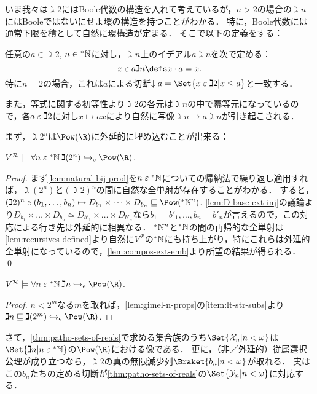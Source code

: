 \documentclass[realisability.tex]{subfiles}
\begin{document}
いま我々は$\gimel 2$にはBoole代数の構造を入れて考えているが，$n > 2$の場合の$\gimel n$にはBooleではないにせよ環の構造を持つことがわかる．
特に，Boole代数には通常下限を積として自然に環構造が定まる．
そこで以下の定義をする：

\begin{definition}
 任意の$a \in \gimel 2$, $n \in \mathord{{}^{*}\mathbb{N}}$に対し，$\gimel n$上のイデアル$a\gimel n$を次で定める：
 \[
  x \strin a \gimel n \defs x \cdot a = x.
 \]
 特に$n = 2$の場合，これは$a$による切断$\downarrow a = \Set{x \strin \gimel 2| x \leq a}$と一致する．

 また，等式に関する初等性より$\gimel 2$の各元は$\gimel n$の中で冪等元になっているので，各$a \mathrel{\varepsilon} \gimel 2$に対し$x \mapsto a x$により自然に写像$\gimel n \to a \gimel n$が引き起こされる．
\end{definition}

まず，$\gimel 2^n$は$\Pow(\R)$に外延的に埋め込むことが出来る：
\begin{lemma}
 $V^{\mathcal{R}} \models \forall n \strin \NN \: \gimel(2^n) \eembto \Pow(\R)$.
\end{lemma}
\begin{proof}
 まず\cref{lem:natural-bij-prod}を$n \mathrel{\varepsilon} \mathord{{}^{*}\mathbb{N}}$についての帰納法で繰り返し適用すれば，$\gimel(2^n)$と$(\gimel 2)^n$の間に自然な全単射が存在することがわかる．
 すると，$(\gimel 2)^n \strni (b_1, \dots, b_n) \mapsto D_{b_1} \times \dots \times D_{b_n} \sqsubseteq \Pow(\NN^n)$.
 \cref{lem:D-base-ext-inj}の議論より$D_{b_1} \times \dots \times D_{b_n} \simeq D_{b'_1} \times \dots \times D_{b'_n}$なら$b_1 = b'_1, \dots, b_n = b'_n$が言えるので，この対応による行き先は外延的に相異なる．
 $\mathord{{}^{*}\mathbb{N}}^n$と$\mathord{{}^{*}\mathbb{N}}$の間の再帰的な全単射は\cref{lem:recursives-defined}より自然に$V^{\mathcal{R}}$の$\mathord{{}^{*}\mathbb{N}}$にも持ち上がり，特にこれらは外延的全単射になっているので，\cref{lem:compos-ext-emb}より所望の結果が得られる． \qed
\end{proof}

\begin{corollary}\label{cor:gimels-ext-embeds}
 $V^{\mathcal{R}} \models \forall n \strin \NN\: \gimel n \eembto \Pow(\R)$.
\end{corollary}
\begin{proof}
 $n < 2^m$なる$m$を取れば，\cref{lem:gimel-n-props}の\ref{item:lt-str-subs}より$\gimel n \sqsubseteq \gimel (2^m) \eembto \Pow(\R)$.
\end{proof}
さて，\cref{thm:patho-sets-of-reals}で求める集合族のうち$\Set{\mathcal{X}_n | n < \omega}$は$\Set{\gimel n | n \strin \NN}$の$\Pow(\R)$における像である．
更に，（非／外延的）従属選択公理が成り立つなら，$\gimel 2$の真の無限減少列$\Braket{b_n | n < \omega}$が取れる．
実はこの$b_n$たちの定める切断が\cref{thm:patho-sets-of-reals}の$\Set{\mathcal{Y}_n | n < \omega}$に対応する．
\end{document}
